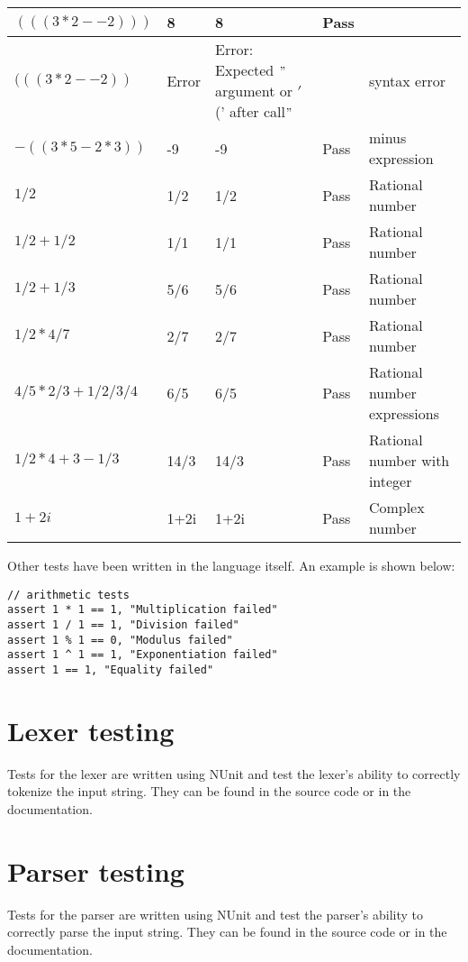 \begin{table}[h]
\begin{tabular}{|p{1.8in}|p{0.5in}|p{0.4in}|p{0.6in}|p{1.4in}|}
    $(((3*2--2)))$ & 8 & 8 & Pass & \\ \hline
    $(((3*2--2))$ & Error & Error: Expected \("\)argument or \('\)(' after call\("\) & & syntax error \\ \hline
    $-((3*5-2*3))$ & -9 & -9 & Pass & minus expression \\ \hline
    $1/2$ & 1/2 & 1/2 & Pass & Rational number \\ \hline
    $1/2 + 1/2$ & 1/1 & 1/1 & Pass & Rational number \\ \hline
    $1/2 + 1/3$ & 5/6 & 5/6 & Pass & Rational number \\ \hline
    $1/2 * 4/7$ & 2/7 & 2/7 & Pass & Rational number \\ \hline 
    $4/5 * 2/3 + 1/2 / 3/4$ & 6/5 & 6/5 & Pass & Rational number expressions \\ \hline
    $1/2 * 4 + 3 - 1/3$ & 14/3 & 14/3 & Pass & Rational number with integer \\ \hline
    $1+2i$ & 1+2i & 1+2i & Pass & Complex number \\ \hline
    \end{tabular}
    \label{tab:table2}
\end{table}

Other tests have been written in the language itself.
An example is shown below:

\begin{verbatim}
// arithmetic tests
assert 1 * 1 == 1, "Multiplication failed"
assert 1 / 1 == 1, "Division failed"
assert 1 % 1 == 0, "Modulus failed"
assert 1 ^ 1 == 1, "Exponentiation failed"
assert 1 == 1, "Equality failed"
\end{verbatim}

\section{Lexer testing}\label{sec:lexer-testing}

Tests for the lexer are written using NUnit and test the lexer's ability to correctly tokenize the input string.
They can be found in the source code or in the documentation.

\section{Parser testing}\label{sec:parser-testing}

Tests for the parser are written using NUnit and test the parser's ability to correctly parse the input string.
They can be found in the source code or in the documentation.

